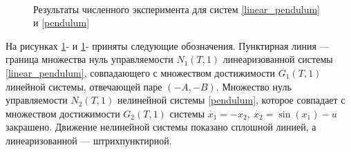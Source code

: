 \documentclass[../main.tex]{subfiles}
\begin{document}
\begin{pr}
\begin{figure}[ht!]
\begin{minipage}[b]{.49\linewidth}
%
			\label{fig:pendulum_T=7}  
		\end{minipage} 
		\caption{Результаты численного эксперимента для систем \eqref{linear_pendulum} и \eqref{pendulum}}\label{fig:pendulum}
	\end{figure}
	 На рисунках  \ref{fig:pendulum}- и \ref{fig:pendulum}- приняты следующие обозначения. Пунктирная линия --- граница множества нуль управляемости $N_1(T,1)$ линеаризованной системы \eqref{linear_pendulum}, совпадающего с множеством достижимости $G_1(T,1)$ линейной системы, отвечающей паре $(-A,-B)$. Множество  нуль управляемости $ N_2(T,1) $ нелинейной системы \eqref{pendulum}, которое совпадает с множеством достижимости $G_2(T,1)$ системы $ \dot{x_1} = -x_2, \
		\dot{x_2} = \sin(x_1) - u$ закрашено.   Движение нелинейной системы показано сплошной линией, а линеаризованной --- штрихпунктирной. 
	

\end{pr}
\end{document}
